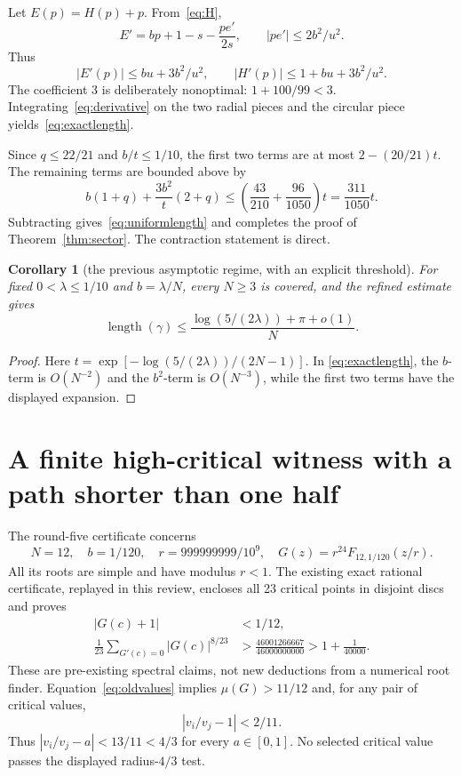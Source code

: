 \documentclass[11pt,a4paper]{article}
\newtheorem{corollary}[theorem]{Corollary}
\theoremstyle{remark}\newtheorem{remark}[theorem]{Remark}
\newcommand{\length}{\operatorname{length}}
\begin{document}
Let $E(p)=H(p)+p$. From~\eqref{eq:H},
\[
 E'=bp+1-s-\frac{pe'}{2s},\qquad
 |pe'|\le2b^2/u^2.
\]
Thus
\begin{equation}\label{eq:derivative}
 |E'(p)|\le bu+3b^2/u^2,
 \qquad |H'(p)|\le1+bu+3b^2/u^2.
\end{equation}
The coefficient $3$ is deliberately nonoptimal:
$1+100/99<3$. Integrating~\eqref{eq:derivative} on the two radial pieces
and the circular piece yields~\eqref{eq:exactlength}.

Since $q\le22/21$ and $b/t\le1/10$, the first two terms are at most
$2-(20/21)t$. The remaining terms are bounded above by
\[
 b(1+q)+\frac{3b^2}{t}(2+q)
 \le\left(\frac{43}{210}+\frac{96}{1050}\right)t
 =\frac{311}{1050}t.
\]
Subtracting gives~\eqref{eq:uniformlength} and completes the proof of
Theorem~\ref{thm:sector}. The contraction statement is direct.

\begin{corollary}[the previous asymptotic regime, with an explicit threshold]
For fixed $0<\lambda\le1/10$ and $b=\lambda/N$, every $N\ge3$ is covered,
and the refined estimate gives
\[
 \length(\gamma)
 \le\frac{\log(5/(2\lambda))+\pi+o(1)}{N}.
\]
\end{corollary}
\begin{proof}
Here $t=\exp[-\log(5/(2\lambda))/(2N-1)]$. In
\eqref{eq:exactlength}, the $b$-term is $O(N^{-2})$ and the $b^2$-term is
$O(N^{-3})$, while the first two terms have the displayed expansion.
\end{proof}

\section{A finite high-critical witness with a path shorter than one half}

The round-five certificate concerns
\begin{equation}\label{eq:G24}
 N=12,\quad b=1/120,\quad r=999999999/10^9,\quad
 G(z)=r^{24}F_{12,1/120}(z/r).
\end{equation}
All its roots are simple and have modulus $r<1$.
The existing exact rational certificate, replayed in this review, encloses
all 23 critical points in disjoint discs and proves
\begin{align}
 |G(c)+1|&<1/12,\label{eq:oldvalues}\\
 \frac1{23}\sum_{G'(c)=0}|G(c)|^{8/23}
 &>\frac{46001266667}{46000000000}
 >1+\frac1{40000}.\label{eq:oldmoment}
\end{align}
These are pre-existing spectral claims, not new deductions from a numerical
root finder. Equation~\eqref{eq:oldvalues} implies $\mu(G)>11/12$ and, for
any pair of critical values,
\[
 |v_i/v_j-1|<2/11.
\]
Thus $|v_i/v_j-a|<13/11<4/3$ for every $a\in[0,1]$.
No selected critical value passes the displayed radius-$4/3$ test.
\end{document}
